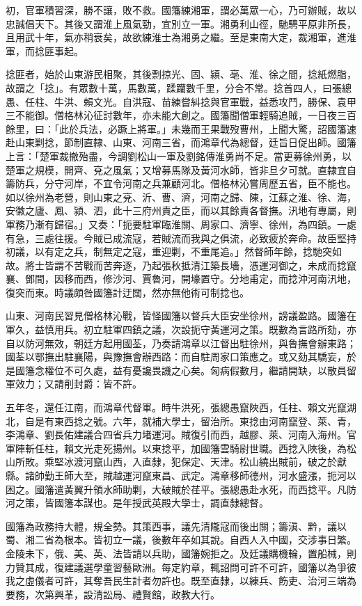 \begin{pinyinscope}
初，官軍積習深，勝不讓，敗不救。國籓練湘軍，謂必萬眾一心，乃可辦賊，故以忠誠倡天下。其後又謂淮上風氣勁，宜別立一軍。湘勇利山徑，馳騁平原非所長，且用武十年，氣亦稍衰矣，故欲練淮士為湘勇之繼。至是東南大定，裁湘軍，進淮軍，而捻匪事起。

捻匪者，始於山東游民相聚，其後剽掠光、固、潁、亳、淮、徐之間，捻紙燃脂，故謂之「捻」。有眾數十萬，馬數萬，蹂躪數千里，分合不常。捻首四人，曰張總愚、任柱、牛洪、賴文光。自洪寇、苗練嘗糾捻與官軍戰，益悉攻鬥，勝保、袁甲三不能御。僧格林沁征討數年，亦未能大創之。國籓聞僧軍輕騎追賊，一日夜三百餘里，曰：「此於兵法，必蹶上將軍。」未幾而王果戰歿曹州，上聞大驚，詔國籓速赴山東剿捻，節制直隸、山東、河南三省，而鴻章代為總督，廷旨日促出師。國籓上言：「楚軍裁撤殆盡，今調劉松山一軍及劉銘傳淮勇尚不足。當更募徐州勇，以楚軍之規模，開齊、兗之風氣；又增募馬隊及黃河水師，皆非旦夕可就。直隸宜自籌防兵，分守河岸，不宜令河南之兵兼顧河北。僧格林沁嘗周歷五省，臣不能也。如以徐州為老營，則山東之兗、沂、曹、濟，河南之歸、陳，江蘇之淮、徐、海，安徽之廬、鳳、潁、泗，此十三府州責之臣，而以其餘責各督撫。汛地有專屬，則軍務乃漸有歸宿。」又奏：「扼要駐軍臨淮關、周家口、濟寧、徐州，為四鎮。一處有急，三處往援。今賊已成流寇，若賊流而我與之俱流，必致疲於奔命。故臣堅持初議，以有定之兵，制無定之寇，重迎剿，不重尾追。」然督師年餘，捻馳突如故。將士皆謂不苦戰而苦奔逐，乃起張秋抵清江築長墻，憑運河御之，未成而捻竄襄、鄧間，因移而西，修沙河、賈魯河，開壕置守。分地甫定，而捻沖河南汛地，復突而東。時議頗咎國籓計迂闊，然亦無他術可制捻也。

山東、河南民習見僧格林沁戰，皆怪國籓以督兵大臣安坐徐州，謗議盈路。國籓在軍久，益慎用兵。初立駐軍四鎮之議，次設扼守黃運河之策。既數為言路所劾，亦自以防河無效，朝廷方起用國荃，乃奏請鴻章以江督出駐徐州，與魯撫會辦東路；國荃以鄂撫出駐襄陽，與豫撫會辦西路：而自駐周家口策應之。或又劾其驕妄，於是國籓念權位不可久處，益有憂讒畏譏之心矣。匈病假數月，繼請開缺，以散員留軍效力；又請削封爵：皆不許。

五年冬，還任江南，而鴻章代督軍。時牛洪死，張總愚竄陜西，任柱、賴文光竄湖北，自是有東西捻之號。六年，就補大學士，留治所。東捻由河南竄登、萊、青，李鴻章、劉長佑建議合四省兵力堵運河。賊復引而西，越膠、萊、河南入海州。官軍陣斬任柱，賴文光走死揚州。以東捻平，加國籓雲騎尉世職。西捻入陜後，為松山所敗。乘堅冰渡河竄山西，入直隸，犯保定、天津。松山繞出賊前，破之於獻縣。諸帥勤王師大至，賊越運河竄東昌、武定。鴻章移師德州，河水盛漲，扼河以困之。國籓遣黃翼升領水師助剿，大破賊於荏平。張總愚赴水死，而西捻平。凡防河之策，皆國籓本謀也。是年授武英殿大學士，調直隸總督。

國籓為政務持大體，規全勢。其策西事，議先清隴寇而後出關；籌滇、黔，議以蜀、湘二省為根本。皆初立一議，後數年卒如其說。自西人入中國，交涉事日繁。金陵未下，俄、美、英、法皆請以兵助，國籓婉拒之。及廷議購機輪，置船械，則力贊其成，復建議選學童習藝歐洲。每定約章，輒詔問可許不可許，國籓以為爭彼我之虛儀者可許，其奪吾民生計者勿許也。既至直隸，以練兵、飭吏、治河三端為要務，次第興革，設清訟局、禮賢館，政教大行。


\end{pinyinscope}
